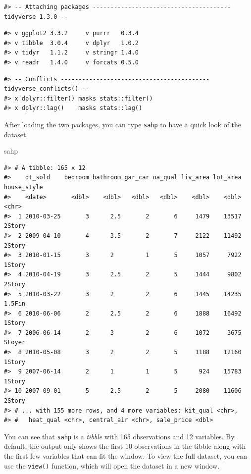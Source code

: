 \documentclass[
]{book}
\newenvironment{Shaded}{\begin{snugshade}}{\end{snugshade}}
\newcommand{\NormalTok}[1]{#1}
\begin{document}
\begin{verbatim}
#> -- Attaching packages --------------------------------------- tidyverse 1.3.0 --
\end{verbatim}

\begin{verbatim}
#> v ggplot2 3.3.2     v purrr   0.3.4
#> v tibble  3.0.4     v dplyr   1.0.2
#> v tidyr   1.1.2     v stringr 1.4.0
#> v readr   1.4.0     v forcats 0.5.0
\end{verbatim}

\begin{verbatim}
#> -- Conflicts ------------------------------------------ tidyverse_conflicts() --
#> x dplyr::filter() masks stats::filter()
#> x dplyr::lag()    masks stats::lag()
\end{verbatim}

After loading the two packages, you can type \texttt{sahp} to have a quick look of the dataset.

\begin{Shaded}
\begin{Highlighting}[]
\NormalTok{sahp}
\end{Highlighting}
\end{Shaded}

\begin{verbatim}
#> # A tibble: 165 x 12
#>    dt_sold    bedroom bathroom gar_car oa_qual liv_area lot_area house_style
#>    <date>       <dbl>    <dbl>   <dbl>   <dbl>    <dbl>    <dbl> <chr>      
#>  1 2010-03-25       3      2.5       2       6     1479    13517 2Story     
#>  2 2009-04-10       4      3.5       2       7     2122    11492 2Story     
#>  3 2010-01-15       3      2         1       5     1057     7922 1Story     
#>  4 2010-04-19       3      2.5       2       5     1444     9802 2Story     
#>  5 2010-03-22       3      2         2       6     1445    14235 1.5Fin     
#>  6 2010-06-06       2      2.5       2       6     1888    16492 1Story     
#>  7 2006-06-14       2      3         2       6     1072     3675 SFoyer     
#>  8 2010-05-08       3      2         2       5     1188    12160 1Story     
#>  9 2007-06-14       2      1         1       5      924    15783 1Story     
#> 10 2007-09-01       5      2.5       2       5     2080    11606 2Story     
#> # ... with 155 more rows, and 4 more variables: kit_qual <chr>,
#> #   heat_qual <chr>, central_air <chr>, sale_price <dbl>
\end{verbatim}

You can see that \texttt{sahp} is a \emph{tibble} with 165 observations and 12 variables. By default, the output only shows the first 10 observations in the tibble along with the first few variables that can fit the window. To view the full dataset, you can use the \texttt{view()} function, which will open the dataset in a new window.
\end{document}
